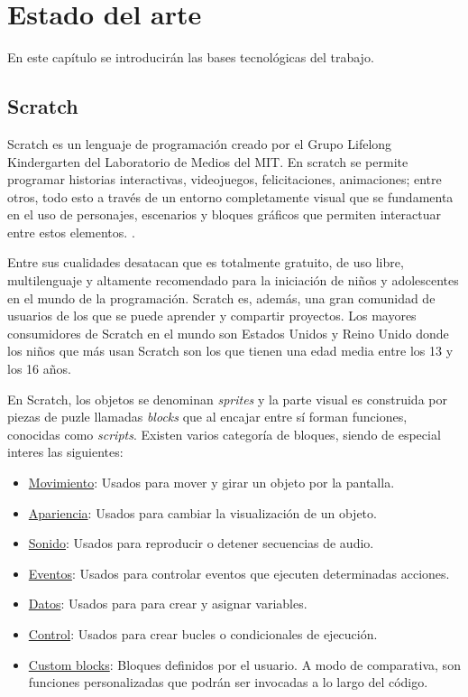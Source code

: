\documentclass[a4paper, 12pt]{book}
\begin{document}

\cleardoublepage
\chapter{Estado del arte}
\label{chap:estado}

En este capítulo se introducirán las bases tecnológicas del trabajo.

\section{Scratch}
\label{sec:Scratch}

Scratch es un lenguaje de programación creado por el Grupo Lifelong Kindergarten del Laboratorio de Medios del MIT. En scratch se permite programar historias interactivas, videojuegos, felicitaciones, animaciones; entre otros, todo esto a través de un entorno completamente visual que se fundamenta en el uso de personajes, escenarios y bloques gráficos que permiten interactuar entre estos elementos. \cite{arotuma2017programacion}. 

Entre sus cualidades desatacan que es totalmente gratuito, de uso libre, multilenguaje y altamente recomendado para la iniciación de niños y adolescentes en el mundo de la programación. Scratch es, además, una gran comunidad de usuarios de los que se puede aprender y compartir proyectos. Los mayores consumidores de Scratch en el mundo son Estados Unidos y Reino Unido donde los niños que más usan Scratch son los que tienen una edad media entre los 13 y los 16 años.

En Scratch, los objetos se denominan \textit{sprites} y la parte visual es construida por piezas de puzle llamadas \textit{blocks} que al encajar entre sí forman funciones, conocidas como \textit{scripts}. Existen varios categoría de bloques, siendo de especial interes las siguientes: 

\begin{itemize}
  	\item \underline{Movimiento}: Usados para mover y girar un objeto por la pantalla.
  	\item \underline{Apariencia}: Usados para cambiar la visualización de un objeto.
  	\item \underline{Sonido}: Usados para reproducir o detener secuencias de audio.
  	\item \underline{Eventos}: Usados para controlar eventos que ejecuten determinadas acciones.
  	\item \underline{Datos}: Usados para para crear y asignar variables.
  	\item \underline{Control}: Usados para crear bucles o condicionales de ejecución.
  	\item \underline{Custom blocks}: Bloques definidos por el usuario. A modo de comparativa, son funciones personalizadas que podrán ser invocadas a lo largo del código.
\end{itemize}
\end{document}
